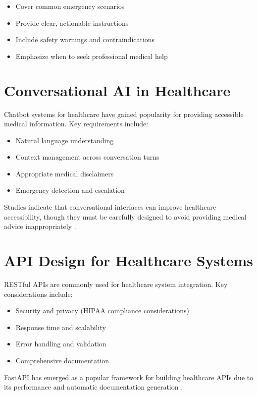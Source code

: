 \begin{itemize}
    \item Cover common emergency scenarios
    \item Provide clear, actionable instructions
    \item Include safety warnings and contraindications
    \item Emphasize when to seek professional medical help
\end{itemize}

\section{Conversational AI in Healthcare}
Chatbot systems for healthcare have gained popularity for providing accessible medical information. Key requirements include:

\begin{itemize}
    \item Natural language understanding
    \item Context management across conversation turns
    \item Appropriate medical disclaimers
    \item Emergency detection and escalation
\end{itemize}

Studies indicate that conversational interfaces can improve healthcare accessibility, though they must be carefully designed to avoid providing medical advice inappropriately \cite{ni2019chatbot}.

\section{API Design for Healthcare Systems}
RESTful APIs are commonly used for healthcare system integration. Key considerations include:

\begin{itemize}
    \item Security and privacy (HIPAA compliance considerations)
    \item Response time and scalability
    \item Error handling and validation
    \item Comprehensive documentation
\end{itemize}

FastAPI has emerged as a popular framework for building healthcare APIs due to its performance and automatic documentation generation \cite{fastapi}.

